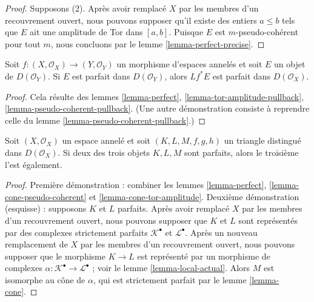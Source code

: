 {\begin{proof}
\medskip\noindent
Supposons (2). Après avoir remplacé $X$ par les membres d'un recouvrement ouvert, nous pouvons supposer qu'il existe des entiers $a \leq b$ tels que $E$ ait une amplitude de Tor dans $[a, b]$. Puisque $E$ est $m$-pseudo-cohérent pour tout $m$, nous concluons par le lemme \ref{lemma-perfect-precise}.
\end{proof}

\begin{lemma}

\label{lemma-perfect-pullback}
Soit $f : (X, \mathcal{O}_X) \to (Y, \mathcal{O}_Y)$ un morphisme d'espaces annelés et soit $E$ un objet de $D(\mathcal{O}_Y)$. Si $E$ est parfait dans $D(\mathcal{O}_Y)$, alors $Lf^*E$ est parfait dans $D(\mathcal{O}_X)$.
\end{lemma}

\begin{proof}

Cela résulte des lemmes \ref{lemma-perfect},
\ref{lemma-tor-amplitude-pullback},
\ref{lemma-pseudo-coherent-pullback}. (Une autre démonstration consiste à reprendre celle du lemme \ref{lemma-pseudo-coherent-pullback}.)

\end{proof}

\begin{lemma}

\label{lemma-two-out-of-three-perfect}

Soit $(X, \mathcal{O}_X)$ un espace annelé et soit $(K, L, M, f, g, h)$
un triangle distingué dans $D(\mathcal{O}_X)$. Si deux des trois objets
$K, L, M$ sont parfaits, alors le troisième l'est également.

\end{lemma}

\begin{proof}

Première démonstration : combiner les lemmes \ref{lemma-perfect}, \ref{lemma-cone-pseudo-coherent} et
\ref{lemma-cone-tor-amplitude}. Deuxième démonstration (esquisse) : supposons $K$ et $L$ parfaits. Après avoir remplacé
$X$ par les membres d'un recouvrement ouvert, nous pouvons supposer que $K$ et $L$
sont représentés par des complexes strictement parfaits $\mathcal{K}^\bullet$
et $\mathcal{L}^\bullet$. Après un nouveau remplacement de $X$ par les membres d'un recouvrement ouvert, nous pouvons supposer que le morphisme $K \to L$ est représenté par un morphisme de complexes $\alpha : \mathcal{K}^\bullet \to \mathcal{L}^\bullet$ ; voir le lemme \ref{lemma-local-actual}. Alors $M$ est isomorphe au cône de $\alpha$, qui est strictement parfait par le lemme \ref{lemma-cone}.


\end{proof}}
